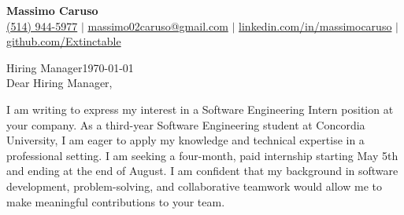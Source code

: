 \documentclass[10pt]{article}
\begin{document}
\newcommand{\fullname}{Massimo Caruso}
\newcommand{\phone}{(514) 944-5977}
\newcommand{\email}{massimo02caruso@gmail.com}
\newcommand{\linkedin}{linkedin.com/in/massimocaruso}
\newcommand{\github}{github.com/Extinctable}

\newcommand*{\hiringManager}{Hiring Manager}
\newcommand*{\company}{your company}
\newcommand*{\address}{8370 Bd Lacordaire Bureau 306, Saint-Leonard, Quebec H1R 3Y6}

\newcommand*{\position}{Software Engineering Intern}
\newcommand*{\companyDetails}{its dedication to supporting the professional and entrepreneurial growth of the Italian-Canadian business community through innovation and collaboration}
\newcommand*{\positionDetails}{contribute to the development of digital solutions that enhance community engagement, streamline business operations, and support CIBPA's mission of fostering economic growth}

\begin{center}
    {\Huge \textbf{\fullname}} \\
    \vspace{1mm}
    {\small 
    \faPhone \hspace{0mm} \href{tel:+15149445977}{\phone} $\vert$ 
    \faEnvelope \hspace{0mm} \href{mailto:massimo02caruso@gmail.com}{\email} $\vert$ 
    \faLinkedin \hspace{0mm} \href{https://linkedin.com/in/massimocaruso}{\linkedin} $\vert$ 
    \faGithub \hspace{0mm} \href{https://github.com/Extinctable}{\github}
    }
\end{center}


\vspace{1.5em}
\hiringManager \hfill \today \\



\vspace{1.5em}
Dear \hiringManager,

I am writing to express my interest in a Software Engineering Intern position at your company. As a third-year Software Engineering student at Concordia University, I am eager to apply my knowledge and technical expertise in a professional setting. I am seeking a four-month, paid internship starting May 5th and ending at the end of August. I am confident that my background in software development, problem-solving, and collaborative teamwork would allow me to make meaningful contributions to your team.
\end{document}

